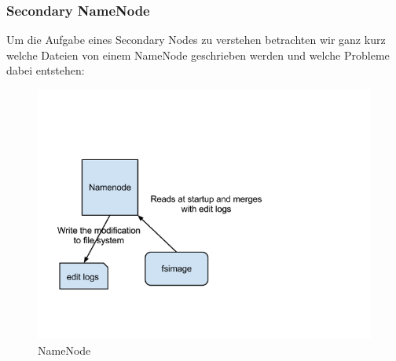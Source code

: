 \subsubsection{Secondary NameNode}
Um die Aufgabe eines Secondary Nodes zu verstehen betrachten wir ganz kurz welche Dateien von einem NameNode geschrieben werden und welche Probleme dabei entstehen:
\begin{figure}
	\centering
	\includegraphics[width=1.0\textwidth]{images/namenode.png}
	\caption{NameNode}
	\label{img:grafik-nameNode}
\end{figure}


